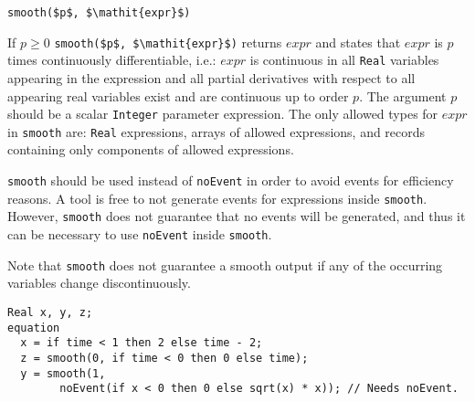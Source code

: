 \begin{operatordefinition}[smooth]
\begin{synopsis}\begin{lstlisting}
smooth($p$, $\mathit{expr}$)
\end{lstlisting}\end{synopsis}
\begin{semantics}
If $p \geq 0$ \lstinline!smooth($p$, $\mathit{expr}$)! returns $\mathit{expr}$ and states that $\mathit{expr}$ is $p$ times continuously differentiable, i.e.: $\mathit{expr}$ is continuous in all \lstinline!Real! variables appearing in the expression and all partial derivatives with respect to all appearing real variables exist and are continuous up to order $p$.
The argument $p$ should be a scalar \lstinline!Integer! parameter expression.
The only allowed types for $\mathit{expr}$ in \lstinline!smooth! are: \lstinline!Real! expressions, arrays of allowed expressions, and records containing only components of allowed expressions.

\lstinline!smooth! should be used instead of \lstinline!noEvent! in order to avoid events for efficiency reasons.
A tool is free to not generate events for expressions inside \lstinline!smooth!.
However, \lstinline!smooth! does not guarantee that no events will be generated, and thus it can be necessary to use \lstinline!noEvent! inside \lstinline!smooth!.

\begin{nonnormative}
Note that \lstinline!smooth! does not guarantee a smooth output if any of the occurring variables change discontinuously.
\end{nonnormative}

\begin{example}
\begin{lstlisting}[language=modelica]
  Real x, y, z;
equation
  x = if time < 1 then 2 else time - 2;
  z = smooth(0, if time < 0 then 0 else time);
  y = smooth(1,
        noEvent(if x < 0 then 0 else sqrt(x) * x)); // Needs noEvent.
\end{lstlisting}
\end{example}
\end{semantics}
\end{operatordefinition}

